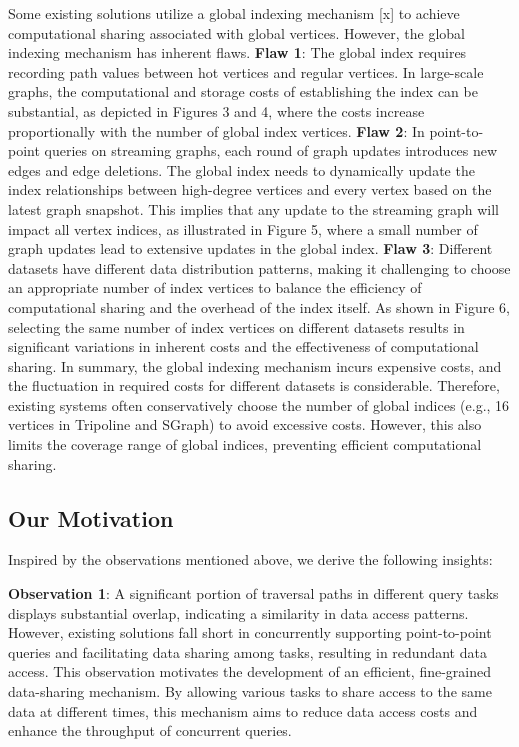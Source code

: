 \documentclass[lettersize,journal]{IEEEtran} %
\begin{document}
Some existing solutions utilize a global indexing mechanism [x] to achieve computational sharing associated with global vertices. However, the global indexing mechanism has inherent flaws. {\bf{Flaw 1}}: The global index requires recording path values between hot vertices and regular vertices. In large-scale graphs, the computational and storage costs of establishing the index can be substantial, as depicted in Figures 3 and 4, where the costs increase proportionally with the number of global index vertices. {\bf{Flaw 2}}: In point-to-point queries on streaming graphs, each round of graph updates introduces new edges and edge deletions. The global index needs to dynamically update the index relationships between high-degree vertices and every vertex based on the latest graph snapshot. This implies that any update to the streaming graph will impact all vertex indices, as illustrated in Figure 5, where a small number of graph updates lead to extensive updates in the global index. {\bf{Flaw 3}}: Different datasets have different data distribution patterns, making it challenging to choose an appropriate number of index vertices to balance the efficiency of computational sharing and the overhead of the index itself. As shown in Figure 6, selecting the same number of index vertices on different datasets results in significant variations in inherent costs and the effectiveness of computational sharing. In summary, the global indexing mechanism incurs expensive costs, and the fluctuation in required costs for different datasets is considerable. Therefore, existing systems often conservatively choose the number of global indices (e.g., 16 vertices in Tripoline\cite{tripoline} and SGraph\cite{sgraph}) to avoid excessive costs. However, this also limits the coverage range of global indices, preventing efficient computational sharing.


\subsection{Our Motivation}
Inspired by the observations mentioned above, we derive the following insights:

{\bf{Observation 1}}: A significant portion of traversal paths in different query tasks displays substantial overlap, indicating a similarity in data access patterns. However, existing solutions fall short in concurrently supporting point-to-point queries and facilitating data sharing among tasks, resulting in redundant data access. This observation motivates the development of an efficient, fine-grained data-sharing mechanism. By allowing various tasks to share access to the same data at different times, this mechanism aims to reduce data access costs and enhance the throughput of concurrent queries.
\end{document}
